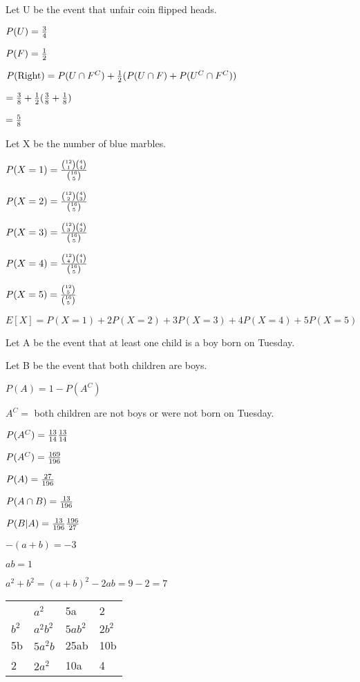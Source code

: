 \documentclass[12pt]{article}
\begin{document}
{    Let U be the event that unfair coin flipped heads.

    $ P(U) = \frac{3}{4} $

    $ P(F) = \frac{1}{2} $

    $ P(\text{Right}) = P(U \cap F^C) + \frac{1}{2} (P(U \cap F)+P(U^C \cap F^C)) $

    $ = \frac{3}{8} + \frac{1}{2}(\frac{3}{8} + \frac{1}{8}) $

    $ = \frac{5}{8} $
    
\hr

     Let X be the number of blue marbles.

     $ P(X=1) = \frac{\binom{12}{1}\binom{4}{4}}{\binom{16}{5}} $

     $ P(X=2) = \frac{\binom{12}{2}\binom{4}{3}}{\binom{16}{5}} $
     
     $ P(X=3) = \frac{\binom{12}{3}\binom{4}{2}}{\binom{16}{5}} $

     $ P(X=4) = \frac{\binom{12}{4}\binom{4}{1}}{\binom{16}{5}} $

     $ P(X=5) = \frac{\binom{12}{5}}{\binom{16}{5}} $

     $ E[X] = P(X=1) + 2P(X=2) + 3P(X=3) + 4P(X=4) + 5P(X=5) $

\hr

     Let A be the event that at least one child is a boy born on Tuesday.
     
     Let B be the event that both children are boys.

     $ P(A) = 1 - P(A^C) $

     $ A^C = $ both children are not boys or were not born on Tuesday.
     
     $ P(A^C) = \frac{13}{14}\frac{13}{14} $

     $ P(A^C) = \frac{169}{196} $

     $ P(A) = \frac{27}{196} $

     $ P(A \cap B) = \frac{13}{196} $

     $ P(B|A) = \frac{13}{196}\frac{196}{27} $

\hr

    $ -(a + b) = -3 $

    $ ab = 1 $

    $ a^2+b^2 = (a+b)^2 - 2ab = 9 - 2 = 7 $

    \begin{table}[htb]
    \begin{tabular}{llll}
        & $a^2$    & 5a    & 2     \\
    $b^2$ & $a^2b^2$ & $5ab^2$ & $2b^2$  \\
    5b  & $5a^2b$  & 25ab  & 10b   \\
    2   & $2a^2$   & 10a   & 4
    \end{tabular}
    \end{table}

}
\end{document}
